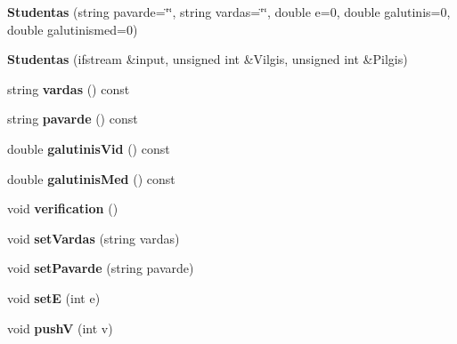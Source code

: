 \begin{DoxyCompactItemize}
\item 
\mbox{\label{class_studentas_af763e8174e6b0e3debb4466b72603ef9}} 
{\bfseries Studentas} (string pavarde=\char`\"{}\char`\"{}, string vardas=\char`\"{}\char`\"{}, double e=0, double galutinis=0, double galutinismed=0)
\item 
\mbox{\label{class_studentas_aae4f9f8ff31040d77e312749b88cdfc9}} 
{\bfseries Studentas} (ifstream \&input, unsigned int \&Vilgis, unsigned int \&Pilgis)
\item 
\mbox{\label{class_studentas_a8f087bcb62ff8c538fbb86adc7de9e56}} 
string {\bfseries vardas} () const
\item 
\mbox{\label{class_studentas_a11320252edec65efce7fc03b6082b9c2}} 
string {\bfseries pavarde} () const
\item 
\mbox{\label{class_studentas_a49a2519eb2a57b8c0b572cf414ccc3fc}} 
double {\bfseries galutinis\+Vid} () const
\item 
\mbox{\label{class_studentas_ab9dcc63a1ad95f1f34db3e5a96449720}} 
double {\bfseries galutinis\+Med} () const
\item 
\mbox{\label{class_studentas_a663d6614967bb8723b238f38f2dddc30}} 
void {\bfseries verification} ()
\item 
\mbox{\label{class_studentas_a5a490370afdf4aab66b0ce0427e08632}} 
void {\bfseries set\+Vardas} (string vardas)
\item 
\mbox{\label{class_studentas_adf50b6cabe54ebd01d298c9690ef5212}} 
void {\bfseries set\+Pavarde} (string pavarde)
\item 
\mbox{\label{class_studentas_a759b7d719961a61fa4867bbf1efc297f}} 
void {\bfseries setE} (int e)
\item 
\mbox{\label{class_studentas_a6b6716151b1177407d74abcd5f70597c}} 
void {\bfseries pushV} (int v)
\item 

\end{DoxyCompactItemize}
